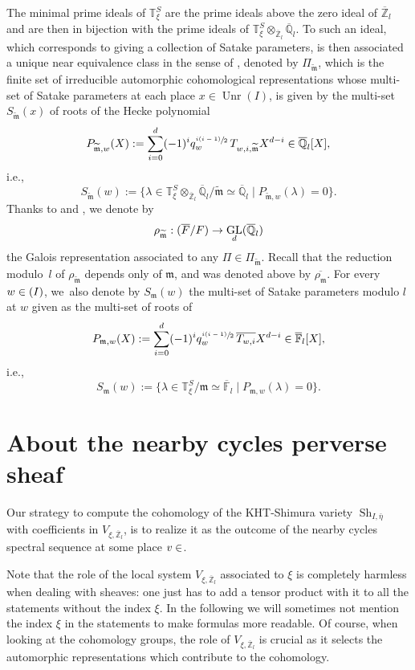 \documentclass[11pt]{article}
\newcommand{\ie}{i.e.,\xspace}
\newcommand{\NoChangel}[1]{%
\expandafter\let\csname old\string#1\endcsname=#1
\let#1=\relax
\newcommand{#1}{\mathcode`l="716C\csname old\string#1\endcsname\mathcode`l="7160 }%
}
\let\sep\mid
\DeclareMathOperator{\GL}{GL}
\theoremstyle{plain}
\theoremstyle{definition}
\numberwithin{equation}{subsection}
\newcommand\Tm{{\mathbb T}}
\newcommand\Fm{{\mathbb F}}
\newcommand\Qm{{\mathbb Q}}
\newcommand\Zm{{\mathbb Z}}
\DeclareMathOperator{\sh}{Sh}
\DeclareMathOperator{\gal}{Gal}\NoChangel{\gal}
\DeclareMathOperator{\spl}{Spl}\NoChangel{\spl}
\DeclareMathOperator{\unr}{Unr}
\begin{document}
The minimal prime ideals of $\Tm^S_{\xi}$ are the prime ideals above the zero ideal of
$\overline \Zm_l$ and are then in bijection with the prime ideals of
$\Tm^S_{\xi} \otimes_{\overline \Zm_l} \overline \Qm_l$.
To such an ideal, which corresponds
to giving a collection of Satake parameters, is then associated a unique near equivalence class in
the sense of \cite{y-t}, denoted by $\Pi_{\widetilde{\mathfrak m}}$, which is the finite set of
irreducible automorphic cohomological representations whose multi-set of Satake parameters
at each place $x \in \unr(I)$, is given by the multi-set $S_{\widetilde{\mathfrak m}}(x)$ of roots of
the Hecke polynomial
\[
P_{\widetilde{\mathfrak{m}},w}(X):=\sum_{i=0}^d(-1)^i q_w^{\sfrac{i(i-1)}{2}}\,
T_{w,i,\widetilde{\mathfrak m}} X^{d-i} \in \overline \Qm_l[X],
\]
\ie\[
S_{\widetilde{\mathfrak{m}}}(w) := \bigl \{\lambda \in \Tm^S_{\xi} \otimes_{\overline \Zm_l}
\overline \Qm_l / \widetilde{\mathfrak m} \simeq \overline \Qm_l \sep
P_{\widetilde{\mathfrak{m}},w}(\lambda)=0 \bigr\}.
\]
Thanks to \cite{h-t} and \cite{y-t}, we denote by
\[
\rho_{\widetilde{\mathfrak m}}:\gal(\overline F/F) \to \GL_d(\overline \Qm_l)
\]
the Galois representation associated to any $\Pi \in \Pi_{\widetilde{\mathfrak m}}$.
Recall that the reduction modulo~$l$ of $\rho_{\widetilde{\mathfrak m}}$ depends only
of $\mathfrak m$, and was denoted above by $\overline{\rho_{\mathfrak m}}$.
For every $w \in \spl(I)$, we~also denote by $S_{\mathfrak{m}}(w)$ the multi-set of Satake parameters modulo $l$ at $w$ given as the multi-set of roots of
\[
P_{\mathfrak{m},w}(X):=\sum_{i=0}^d(-1)^i q_w^{\sfrac{i(i-1)}{2}}\, \overline{T_{w,i}} X^{d-i}
\in \overline \Fm_l[X],
\]
\ie\[
S_{\mathfrak{m}}(w) := \bigl \{\lambda \in \Tm^S_\xi/\mathfrak m \simeq \overline \Fm_l
\sep P_{\mathfrak{m},w}(\lambda)=0 \bigr\}.
\]

\section{About the nearby cycles perverse sheaf}

Our strategy to compute the cohomology of the KHT-Shimura variety $\sh_{I,\bar \eta}$ with
coefficients in $V_{\xi,\overline \Zm_l}$, is to realize it as the outcome of the nearby cycles
spectral sequence at some place $v \in \spl$.

Note that the role of the local system $V_{\xi,\overline \Zm_l}$
associated to $\xi$ is completely harmless when
dealing with sheaves: one just has to add a tensor product with it to all the
statements without the index $\xi$. In the following we will sometimes not mention the index
$\xi$ in the statements to make formulas more readable. Of course, when looking at the
cohomology groups, the role of $V_{\xi,\overline \Zm_l}$ is crucial as it selects the
automorphic representations which contribute to the cohomology.
\end{document}
